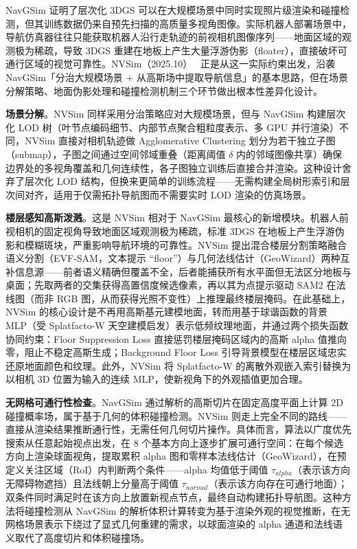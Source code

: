 NavGSim 证明了层次化 3DGS 可以在大规模场景中同时实现照片级渲染和碰撞检测，但其训练数据仍来自预先扫描的高质量多视角图像。实际机器人部署场景中，导航仿真器往往只能获取机器人沿行走轨迹的前视相机图像序列——地面区域的观测极为稀疏，导致 3DGS 重建在地板上产生大量浮游伪影（floater），直接破坏可通行区域的视觉可靠性。NVSim（2025.10）~\cite{2510_24335} 正是从这一实际约束出发，沿袭 NavGSim「分治大规模场景 + 从高斯场中提取导航信息」的基本思路，但在场景分解策略、地面伪影处理和碰撞检测机制三个环节做出根本性差异化设计。

\textbf{场景分解}。NVSim 同样采用分治策略应对大规模场景，但与 NavGSim 构建层次化 LOD 树（叶节点编码细节、内部节点聚合粗粒度表示、多 GPU 并行渲染）不同，NVSim 直接对相机轨迹做 Agglomerative Clustering 划分为若干独立子图（submap），子图之间通过空间邻域重叠（距离阈值 $\delta$ 内的邻域图像共享）确保边界处的多视角覆盖和几何连续性，各子图独立训练后直接合并渲染。这种设计舍弃了层次化 LOD 结构，但换来更简单的训练流程——无需构建全局树形索引和层次间对齐，适用于仅需拓扑导航图而不需要实时 LOD 渲染的仿真场景。

\textbf{楼层感知高斯泼溅}。这是 NVSim 相对于 NavGSim 最核心的新增模块。机器人前视相机的固定视角导致地面区域观测极为稀疏，标准 3DGS 在地板上产生浮游伪影和模糊斑块，严重影响导航环境的可靠性。NVSim 提出混合楼层分割策略融合语义分割（EVF-SAM，文本提示 ``floor''）与几何法线估计（GeoWizard）两种互补信息源——前者语义精确但覆盖不全，后者能捕获所有水平面但无法区分地板与桌面；先取两者的交集获得高置信度候选像素，再以其为点提示驱动 SAM2 在法线图（而非 RGB 图，从而获得光照不变性）上推理最终楼层掩码。在此基础上，NVSim 的核心设计是不再用高斯基元建模地面，转而用基于球谐函数的背景 MLP（受 Splatfacto-W 天空建模启发）表示低频纹理地面，并通过两个损失函数协同约束：Floor Suppression Loss 直接惩罚楼层掩码区域内的高斯 alpha 值推向零，阻止不稳定高斯生成；Background Floor Loss 引导背景模型在楼层区域忠实还原地面颜色和纹理。此外，NVSim 将 Splatfacto-W 的离散外观嵌入索引替换为以相机 3D 位置为输入的连续 MLP，使新视角下的外观插值更加合理。

\textbf{无网格可通行性检查}。NavGSim 通过解析的高斯切片在固定高度平面上计算 2D 碰撞概率场，属于基于几何的体积碰撞检测。NVSim 则走上完全不同的路线——直接从渲染结果推断通行性，无需任何几何切片操作。具体而言，算法以广度优先搜索从任意起始视点出发，在 8 个基本方向上逐步扩展可通行空间：在每个候选方向上渲染球面视角，提取累积 alpha 图和零样本法线估计（GeoWizard），在预定义关注区域（RoI）内判断两个条件——alpha 均值低于阈值 $\tau_{alpha}$（表示该方向无障碍物遮挡）且法线朝上分量高于阈值 $\tau_{normal}$（表示该方向存在可通行地面）；双条件同时满足时在该方向上放置新视点节点，最终自动构建拓扑导航图。这种方法将碰撞检测从 NavGSim 的解析体积计算转变为基于渲染外观的视觉推断，在无网格场景表示下绕过了显式几何重建的需求，以球面渲染的 alpha 通道和法线语义取代了高度切片和体积碰撞场。

